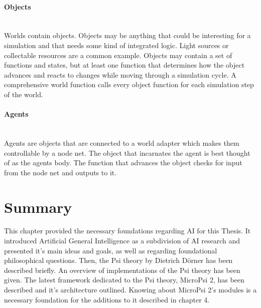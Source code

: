         \paragraph{Objects}$\;$ \\
Worlds contain objects. Objects may be anything that could be interesting for a simulation and that needs some kind of integrated logic. Light sources or collectable resources are a common example. Objects may contain a set of functions and states, but at least one function that determines how the object advances and reacts to changes while moving through a simulation cycle. A comprehensive world function calls every object function for each simulation step of the world.

        \paragraph{Agents}$\;$ \\
Agents are objects that are connected to a world adapter which makes them controllable by a node net. The object that incarnates the agent is best thought of as the agents body. The function that advances the object checks for input from the node net and outputs to it.
        
    \section{Summary}
This chapter provided the necessary foundations regarding AI for this Thesis. It introduced Artificial General Intelligence as a subdivision of AI research and presented it's main ideas and goals, as well as regarding foundational philosophical questions.
Then, the Psi theory by Dietrich Dörner has been described briefly. An overview of implementations of the Psi theory has been given. The latest framework dedicated to the Psi theory, MicroPsi 2, has been described and it's architecture outlined. Knowing about MicroPsi 2's modules is a necessary foundation for the additions to it described in chapter 4.